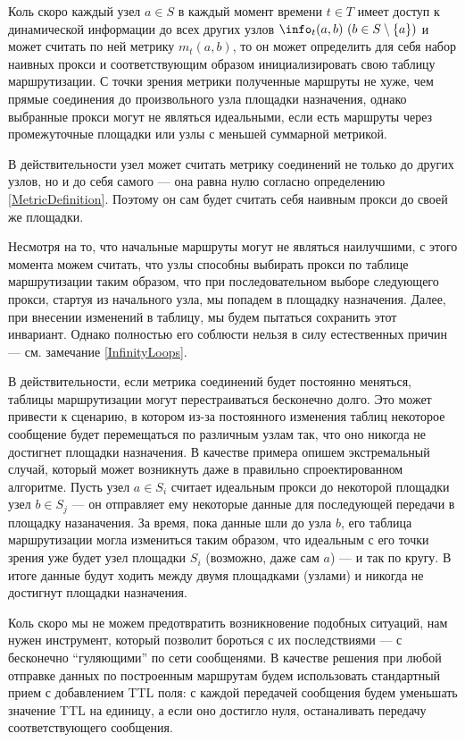 Коль скоро каждый узел $a \in S$ в каждый момент времени $t \in T$ имеет доступ к динамической информации до всех других узлов $\info_t(a, b)\ (b \in S \setminus \{a\})$ и может считать по ней метрику $m_t(a, b)$, то он может определить для себя набор наивных прокси и соответствующим образом инициализировать свою таблицу маршрутизации. С точки зрения метрики полученные маршруты не хуже, чем прямые соединения до произвольного узла площадки назначения, однако выбранные прокси могут не являться идеальными, если есть маршруты через промежуточные площадки или узлы с меньшей суммарной метрикой.

\begin{remark}
\label{SelfRouting}
    В действительности узел может считать метрику соединений не только до других узлов, но и до себя самого --- она равна нулю согласно определению \ref{MetricDefinition}. Поэтому он сам будет считать себя наивным прокси до своей же площадки.
\end{remark}

Несмотря на то, что начальные маршруты могут не являться наилучшими, с этого момента можем считать, что узлы способны выбирать прокси по таблице маршрутизации таким образом, что при последовательном выборе следующего прокси, стартуя из начального узла, мы попадем в площадку назначения. Далее, при внесении изменений в таблицу, мы будем пытаться сохранить этот инвариант. Однако полностью его соблюсти нельзя в силу естественных причин --- см. замечание \ref{InfinityLoops}.

\begin{remark}
\label{InfinityLoops}
    В действительности, если метрика соединений будет постоянно меняться, таблицы маршрутизации могут перестраиваться бесконечно долго. Это может привести к сценарию, в котором из-за постоянного изменения таблиц некоторое сообщение будет перемещаться по различным узлам так, что оно никогда не достигнет площадки назначения. В качестве примера опишем экстремальный случай, который может возникнуть даже в правильно спроектированном алгоритме. Пусть узел $a \in S_i$ считает идеальным прокси до некоторой площадки узел $b \in S_j$ --- он отправляет ему некоторые данные для последующей передачи в площадку назаначения. За время, пока данные шли до узла $b$, его таблица маршрутизации могла измениться таким образом, что идеальным с его точки зрения уже будет узел площадки $S_i$ (возможно, даже сам $a$) --- и так по кругу. В итоге данные будут ходить между двумя площадками (узлами) и никогда не достигнут площадки назначения.
    
    Коль скоро мы не можем предотвратить возникновение подобных ситуаций, нам нужен инструмент, который позволит бороться с их последствиями --- с бесконечно \enquote{гуляющими} по сети сообщенями. В качестве решения при любой отправке данных по построенным маршрутам будем использовать стандартный \cite[с.~2]{RFC0791} прием с добавлением TTL поля: с каждой передачей сообщения будем уменьшать значение TTL на единицу, а если оно достигло нуля, останаливать передачу соответствующего сообщения.
\end{remark}

